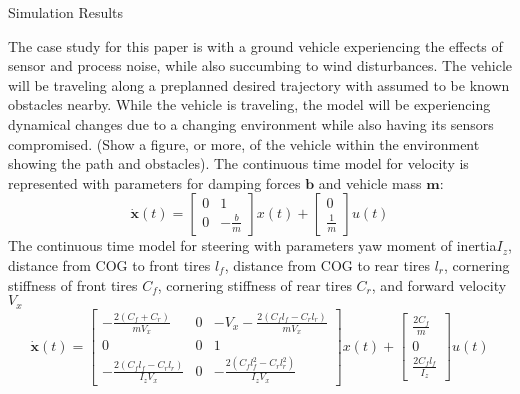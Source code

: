 
\begin{section}{Simulation Results}
\label{sec:simulation}

The case study for this paper is with a ground vehicle experiencing the effects of sensor and process noise, while also succumbing to wind disturbances. The vehicle will be traveling along a preplanned desired trajectory with assumed to be known obstacles nearby. While the vehicle is traveling, the model will be experiencing dynamical changes due to a changing environment while also having its sensors compromised. (Show a figure, or more, of the vehicle within the environment showing the path and obstacles). The continuous time model for velocity is represented with parameters for damping forces $\bm{b}$ and vehicle mass $\bm{m}$:
\begin{equation}
\bm{\dot{x}}(t) = \begin{bmatrix} 0 & 1 \\
  0 & -\frac{b}{m} \end{bmatrix}x(t) + \begin{bmatrix} 0  \\  \frac{1}{m} \end{bmatrix}u(t)
\end{equation}
The continuous time model for steering with parameters yaw moment of inertia$I_z$, distance from COG to front tires $l_f$, distance from COG to rear tires $l_r$, cornering stiffness of front tires $C_f$, cornering stiffness of rear tires $C_r$, and forward velocity $V_x$
\begin{equation}
\bm{\dot{x}}(t) = \begin{bmatrix} -\frac{2(C_f+C_r)}{mV_x} & 0 & -V_x-\frac{2(C_fl_f-C_rl_r)}{mV_x} \\ 0 & 0 & 1 \\ -\frac{2(C_fl_f-C_rl_r)}{I_zV_x} & 0 & -\frac{2(C_fl_f^2-C_rl_r^2)}{I_zV_x}\end{bmatrix}x(t)  + \begin{bmatrix} \frac{2C_f}{m} \\ 0  \\  \frac{2C_fl_f}{I_z} \end{bmatrix}u(t)
\end{equation}



\end{section}